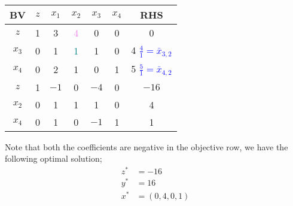 \documentclass[a4paper, 12pt]{article}
\newcommand{\violet}[1]{\textcolor{violet}{#1}}
\newcommand{\blue}[1]{\textcolor{blue}{#1}}
\newcommand{\teal}[1]{\textcolor{teal}{#1}}
\begin{document}
                \begin{center}
                    \begin{tabular}{c|ccccc|c}
                        BV & $z$ & $x_1$ & $x_2$ & $x_3$ & $x_4$ & RHS \\
                        \hline
                        $z$ & 1 & 3 & \violet{4} & 0 & 0 & 0 \\
                        $x_3$ & 0 & 1 & \teal{1} & 1 & 0 & 4 \blue{$\frac{4}{1} = \bar{x}_{3, 2}$} \\
                        $x_4$ & 0 & 2 & 1 & 0 & 1 & 5 \blue{$\frac{5}{1} = \bar{x}_{4, 2}$} \\
                        \hline
                        $z$ & 1 & $-1$ & 0 & $-4$ & 0 & $-16$ \\
                        $x_2$ & 0 & 1 & 1 & 1 & 0 & 4 \\
                        $x_4$ & 0 & 1 & 0 & $-1$ & 1 & 1 \\
                    \end{tabular}
                \end{center}
                Note that both the coefficients are negative in the objective row, we have the following optimal solution;
                \begin{align*}
                    z^* & = -16 \\
                    y^* & = 16 \\
                    x^* & = (0, 4, 0, 1)
                \end{align*}
\end{document}
